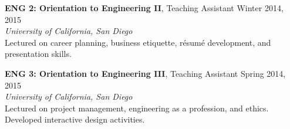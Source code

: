 \documentclass[]{res}
\begin{document}
\begin{resume}
\textbf{ENG 2: Orientation to Engineering II}, Teaching Assistant \hfill Winter 2014, 2015 \\
\textit{University of California, San Diego} \\
Lectured on career planning, business etiquette, r\'esum\'e development, and presentation skills.

\textbf{ENG 3: Orientation to Engineering III}, Teaching Assistant \hfill Spring 2014, 2015 \\
\textit{University of California, San Diego} \\
Lectured on project management, engineering as a profession, and ethics. \\
Developed interactive design activities.


%


%
%
%
%
%
%



\end{resume}
\end{document}
